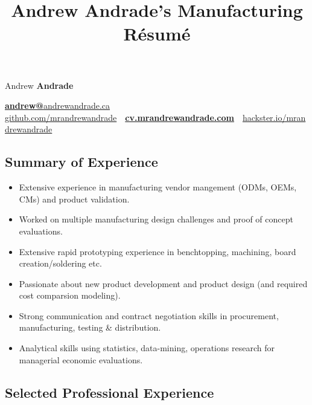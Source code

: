 \documentclass[pdftex,11pt,letterpaper]{article}
\title{Andrew Andrade's Manufacturing Résumé}
\begin{document}
\font

\begin{center}
  {\Huge Andrew \textbf{Andrade}}

  {\large
    \href{mailto:andrew@andrewandrade.ca}{\textbf{andrew@}}\href{http://andrewandrade.ca}{andrewandrade.ca} \\ 

    \href{https://github.com/mrandrewandrade}{github.com/mrandrewandrade}\ \textperiodcentered \ \href{http://cv.mrandrewandrade.com}{\textbf{cv.mrandrewandrade.com}}\ \textperiodcentered \ \href{https://www.hackster.io/mrandrewandrade}{hackster.io/mrandrewandrade}
  }
\end{center}

\subsection*{Summary of Experience}

\begin{itemize}[before=,after=]

\item Extensive experience in manufacturing vendor mangement (ODMs, OEMs, CMs) and product validation.
  
\item Worked on multiple manufacturing design challenges and proof of concept evaluations.

\item Extensive rapid prototyping experience in benchtopping, machining, board creation/soldering etc.

\item Passionate about new product development and product design (and required cost comparsion modeling).

\item Strong communication and contract negotiation skills in procurement, manufacturing, testing \& distribution.

\item Analytical skills using statistics, data-mining, operations research for managerial economic evaluations.

\end{itemize}

\subsection*{Selected Professional Experience}
\end{document}
